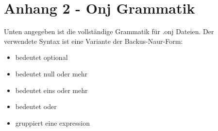 
\chapter{Anhang 2 - Onj Grammatik}\label{ch:anhang-2}

\renewcommand{\kapitelautor}{Autor: Marvin Kurka}

Unten angegeben ist die vollständige Grammatik für .onj Dateien.
Der verwendete Syntax ist eine Variante der Backus-Naur-Form:

\begin{itemize}
    \item {} bedeutet optional
    \item \inlineCode{*} bedeutet null oder mehr
    \item \inlineCode{+} bedeutet eins oder mehr
    \item \inlineCode{|} bedeutet oder
    \item {} gruppiert eine expression
\end{itemize}

